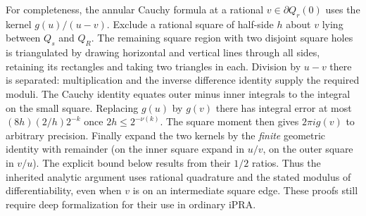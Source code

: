 For completeness, the annular Cauchy formula at a rational $v\in\partial Q_r(0)$ uses the kernel $g(u)/(u-v)$. Exclude a rational square of half-side $h$ about $v$ lying between $Q_s$ and $Q_R$. The remaining square region with two disjoint square holes is triangulated by drawing horizontal and vertical lines through all sides, retaining its rectangles and taking two triangles in each. Division by $u-v$ there is separated: multiplication and the inverse difference identity supply the required moduli. The Cauchy identity equates outer minus inner integrals to the integral on the small square. Replacing $g(u)$ by $g(v)$ there has integral error at most $(8h)(2/h)2^{-k}$ once $2h\le2^{-\nu(k)}$. The square moment then gives $2\pi i g(v)$ to arbitrary precision. Finally expand the two kernels by the \emph{finite} geometric identity with remainder (on the inner square expand in $u/v$, on the outer square in $v/u$). The explicit bound below results from their $1/2$ ratios. Thus the inherited analytic argument uses rational quadrature and the stated modulus of differentiability, even when $v$ is on an intermediate square edge. These proofs still require deep formalization for their use in ordinary iPRA.
